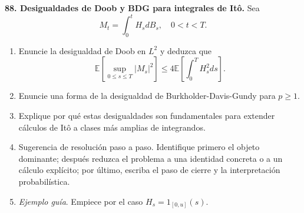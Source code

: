 \documentclass[11pt, letterpaper]{article}
\begin{document}
\begin{ejercicio}
    \textbf{88. Desigualdades de Doob y BDG para integrales de Itô.} Sea
    \[ M_{t}=\int_{0}^{t}H_{s}dB_{s}, \quad 0<t<T. \]
    \begin{enumerate}
        \item Enuncie la desigualdad de Doob en $L^{2}$ y deduzca que
        \[ \mathbb{E}[\sup_{0\le s\le T}|M_{s}|^{2}]\le 4\mathbb{E}\left[\int_{0}^{T}H_{s}^{2}ds\right]. \]
        \item Enuncie una forma de la desigualdad de Burkholder-Davis-Gundy para $p\ge 1$.
        \item Explique por qué estas desigualdades son fundamentales para extender cálculos de Itô a clases más amplias de integrandos.
        \item Sugerencia de resolución paso a paso. Identifique primero el objeto dominante; después reduzca el problema a una identidad concreta o a un cálculo explícito; por último, escriba el paso de cierre y la interpretación probabilística.
        \item \textit{Ejemplo guía}. Empiece por el caso $H_{s}=1_{[0,u]}(s)$.
    \end{enumerate}
\end{ejercicio}

\vspace{5mm}
\end{document}
